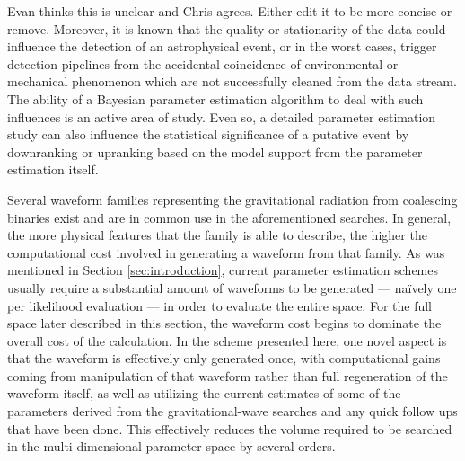 {\color{blue} Evan thinks this is unclear and Chris agrees. Either edit it to be more concise or remove.}
Moreover, it is known\cite{glitch,detchar,glitch_pe} that the quality or stationarity of the data could influence the detection of an astrophysical event, or in the worst cases, trigger detection pipelines from the accidental coincidence of environmental or mechanical phenomenon which are not successfully cleaned from the data stream. The ability of a Bayesian parameter estimation algorithm to deal with such influences is an active area of study\cite{glitchfitting}. Even so, a detailed parameter estimation study can also influence the statistical significance of a putative event by downranking or upranking based on the model support from the parameter estimation itself.

Several waveform families representing the gravitational radiation from coalescing binaries exist and are in common use in the aforementioned searches\cite{waveforms}. In general, the more physical features that the family is able to describe, the higher the computational cost involved in generating a waveform from that family. As was mentioned in Section \ref{sec:introduction}, current parameter estimation schemes usually require a substantial amount of waveforms to be generated --- na\"ively one per likelihood evaluation --- in order to evaluate the entire space. For the full space later described in this section, the waveform cost begins to dominate the overall cost of the calculation. In the scheme presented here, one novel aspect is that the waveform is effectively only generated once, with computational gains coming from manipulation of that waveform rather than full regeneration of the waveform itself, as well as utilizing the current estimates of some of the parameters derived from the gravitational-wave searches and any quick follow ups that have been done. This effectively reduces the volume required to be searched in the multi-dimensional parameter space by several orders.
